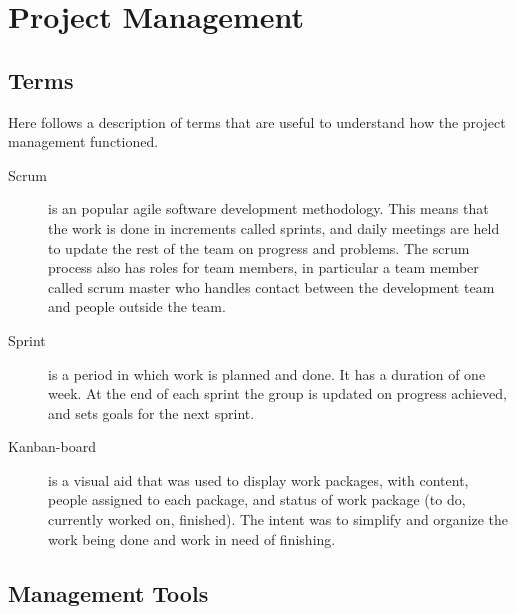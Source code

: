 \chapter{Project Management}
\section{Terms}
Here follows a description of terms that are useful to understand how the project management functioned. 

\begin{description}
\item[Scrum] \label{def:scrum}is an popular agile software development methodology. This means that the work is done in increments called sprints, and daily meetings are held to update the rest of the team on progress and problems. The scrum process also has roles for team members, in particular a team member called scrum master who handles contact between the development team and people outside the team.

\item[Sprint] \label{def:sprint} is a period in which work is planned and done. It has a duration of one week. At the end of each sprint the group is updated on progress achieved, and sets goals for the next sprint. 
\item[Kanban-board] \label{def:kanban} is a visual aid that was used to display work packages, with content, people assigned to each package, and status of work package (to do, currently worked on, finished). The intent was to simplify and organize the work being done and work in need of finishing.
\end{description}

\section{Management Tools}
 
